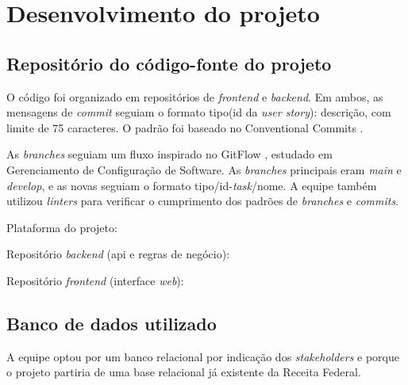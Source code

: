 \section[Desenvolvimento do projeto]{Desenvolvimento do projeto}

\subsection{Repositório do código-fonte do projeto}
  O código foi organizado em repositórios de \textit{frontend} e \textit{backend}.
Em ambos, as mensagens de \textit{commit} seguiam o formato tipo(id da
\textit{user story}): descrição, com limite de 75 caracteres. O padrão foi baseado
no Conventional Commits \cite{conventionalcommits}.

As \textit{branches} seguiam um fluxo inspirado no GitFlow
\cite{atlassian-gitflow}, estudado em Gerenciamento de Configuração de Software.
As \textit{branches} principais eram \textit{main} e \textit{develop}, e as novas
seguiam o formato tipo/id-\textit{task}/nome. A equipe também utilizou
\textit{linters} para verificar o cumprimento dos padrões de \textit{branches}
e \textit{commits}.

Plataforma do projeto:

{\footnotesize{}}

Repositório \textit{backend} (\ac{api} e regras de negócio):

{\footnotesize{}}

Repositório \textit{frontend} (interface \textit{web}):

{\footnotesize{}}

\subsection{Banco de dados utilizado}
  A equipe optou por um banco relacional por indicação dos \textit{stakeholders}
e porque o projeto partiria de uma base relacional já existente da Receita
Federal.

